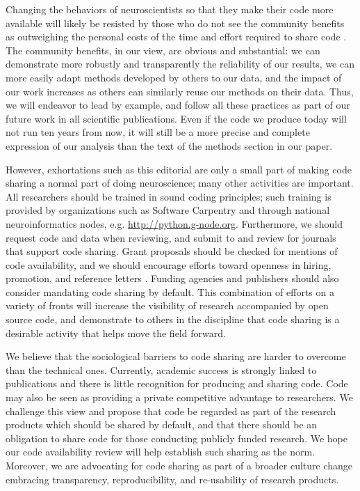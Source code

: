 \documentclass[11pt]{article}
\begin{document}
Changing the behaviors of neuroscientists so that they make their code more
available will likely be resisted by those who do not see the community
benefits as outweighing the personal costs of the time and effort required to
share code \cite{stodden2010scientific}. The community benefits, in our view,
are obvious and substantial: we can demonstrate more robustly and transparently
the reliability of our results, we can more easily adapt methods developed by
others to our data, and the impact of our work increases as others can
similarly reuse our methods on their data. Thus, we will endeavor to lead by
example, and follow all these practices as part of our future work in all
scientific publications. Even if the code we produce today will not run ten
years from now, it will still be a more precise and complete expression of our
analysis than the text of the methods section in our paper. 

However, exhortations such as this editorial are only a small part of
making code sharing a normal part of doing neuroscience; many other
activities are important.  All researchers should be trained in sound
coding principles; such training is provided by organizations such as
Software Carpentry \cite{wilson_best_2014} and through national neuroinformatics
nodes, e.g. \url{http://python.g-node.org}.  Furthermore, we should
request code and data when reviewing, and submit to and review for
journals that support code sharing.  Grant proposals should be checked
for mentions of code availability, and we should encourage efforts
toward openness in hiring, promotion, and reference letters
\cite{leveque2012reproducible}. Funding agencies and publishers should
also consider mandating code sharing by default.  This combination of
efforts on a variety of fronts will increase the visibility of
research accompanied by open source code, and demonstrate to others in
the discipline that code sharing is a desirable activity that helps
move the field forward.

We believe that the sociological barriers to code sharing are harder
to overcome than the technical ones. Currently, academic success is
strongly linked to publications and there is little recognition for
producing and sharing code. Code may also be seen as providing a
private competitive advantage to researchers. We challenge this view
and propose that code be regarded as part of the research products
which should be shared by default, and that there should be an
obligation to share code for those conducting publicly funded
research. We hope our code availability review will help establish
such sharing as the norm.  Moreover, we are advocating for code
sharing as part of a broader culture change embracing transparency,
reproducibility, and re-usability of research products.
\end{document}
